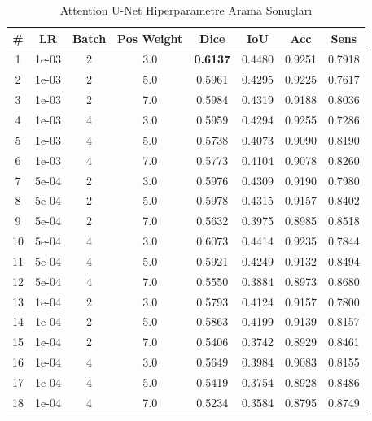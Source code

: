 \begin{table}[htbp]
\centering
\caption{Attention U-Net Hiperparametre Arama Sonuçları}
\label{tab:hyperparam_attention_unet}
\begin{tabular}{cccccccc}
\hline
\textbf{\#} & \textbf{LR} & \textbf{Batch} & \textbf{Pos Weight} & \textbf{Dice} & \textbf{IoU} & \textbf{Acc} & \textbf{Sens} \\
\hline
1 & 1e-03 & 2 & 3.0 & \textbf{0.6137} & 0.4480 & 0.9251 & 0.7918 \\
2 & 1e-03 & 2 & 5.0 & 0.5961 & 0.4295 & 0.9225 & 0.7617 \\
3 & 1e-03 & 2 & 7.0 & 0.5984 & 0.4319 & 0.9188 & 0.8036 \\
4 & 1e-03 & 4 & 3.0 & 0.5959 & 0.4294 & 0.9255 & 0.7286 \\
5 & 1e-03 & 4 & 5.0 & 0.5738 & 0.4073 & 0.9090 & 0.8190 \\
6 & 1e-03 & 4 & 7.0 & 0.5773 & 0.4104 & 0.9078 & 0.8260 \\
7 & 5e-04 & 2 & 3.0 & 0.5976 & 0.4309 & 0.9190 & 0.7980 \\
8 & 5e-04 & 2 & 5.0 & 0.5978 & 0.4315 & 0.9157 & 0.8402 \\
9 & 5e-04 & 2 & 7.0 & 0.5632 & 0.3975 & 0.8985 & 0.8518 \\
10 & 5e-04 & 4 & 3.0 & 0.6073 & 0.4414 & 0.9235 & 0.7844 \\
11 & 5e-04 & 4 & 5.0 & 0.5921 & 0.4249 & 0.9132 & 0.8494 \\
12 & 5e-04 & 4 & 7.0 & 0.5550 & 0.3884 & 0.8973 & 0.8680 \\
13 & 1e-04 & 2 & 3.0 & 0.5793 & 0.4124 & 0.9157 & 0.7800 \\
14 & 1e-04 & 2 & 5.0 & 0.5863 & 0.4199 & 0.9139 & 0.8157 \\
15 & 1e-04 & 2 & 7.0 & 0.5406 & 0.3742 & 0.8929 & 0.8461 \\
16 & 1e-04 & 4 & 3.0 & 0.5649 & 0.3984 & 0.9083 & 0.8155 \\
17 & 1e-04 & 4 & 5.0 & 0.5419 & 0.3754 & 0.8928 & 0.8486 \\
18 & 1e-04 & 4 & 7.0 & 0.5234 & 0.3584 & 0.8795 & 0.8749 \\
\hline
\end{tabular}
\end{table}

